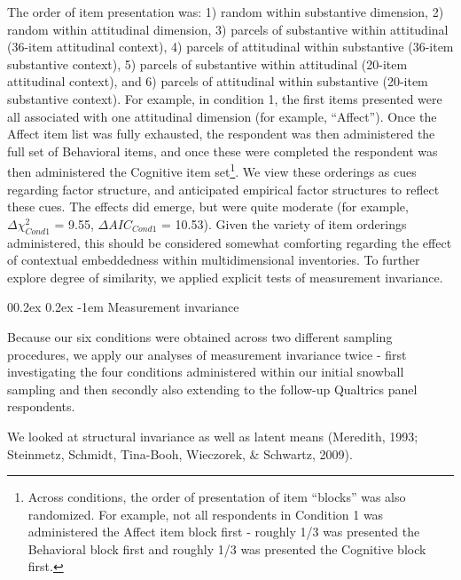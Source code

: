 \documentclass[
  man]{apa7}
\makeatletter
\let\oldparagraph\paragraph
\renewcommand{\paragraph}[1]{\oldparagraph{#1}\mbox{}}
\renewcommand{\paragraph}{\@startsection{paragraph}{4}{\parindent}%
  {0\baselineskip \@plus 0.2ex \@minus 0.2ex}%
  {-1em}%
  {\normalfont\normalsize\bfseries\itshape\typesectitle}}
\makeatother
\begin{document}
The order of item presentation was: 1) random within substantive dimension, 2) random within attitudinal dimension, 3) parcels of substantive within attitudinal (36-item attitudinal context), 4) parcels of attitudinal within substantive (36-item substantive context), 5) parcels of substantive within attitudinal (20-item attitudinal context), and 6) parcels of attitudinal within substantive (20-item substantive context). For example, in condition 1, the first items presented were all associated with one attitudinal dimension (for example, ``Affect''). Once the Affect item list was fully exhausted, the respondent was then administered the full set of Behavioral items, and once these were completed the respondent was then administered the Cognitive item set\footnote{Across conditions, the order of presentation of item ``blocks'' was also randomized. For example, not all respondents in Condition 1 was administered the Affect item block first - roughly 1/3 was presented the Behavioral block first and roughly 1/3 was presented the Cognitive block first.}. We view these orderings as cues regarding factor structure, and anticipated empirical factor structures to reflect these cues. The effects did emerge, but were quite moderate (for example, \(\Delta{\chi^2_{Cond1}}\) = 9.55, \(\Delta{AIC_{Cond1}}\) = 10.53). Given the variety of item orderings administered, this should be considered somewhat comforting regarding the effect of contextual embeddedness within multidimensional inventories. To further explore degree of similarity, we applied explicit tests of measurement invariance.

\hypertarget{measurement-invariance}{%
\paragraph{Measurement invariance}\label{measurement-invariance}}

Because our six conditions were obtained across two different sampling procedures, we apply our analyses of measurement invariance twice - first investigating the four conditions administered within our initial snowball sampling and then secondly also extending to the follow-up Qualtrics panel respondents.

We looked at structural invariance as well as latent means (Meredith, 1993; Steinmetz, Schmidt, Tina-Booh, Wieczorek, \& Schwartz, 2009).
\end{document}
